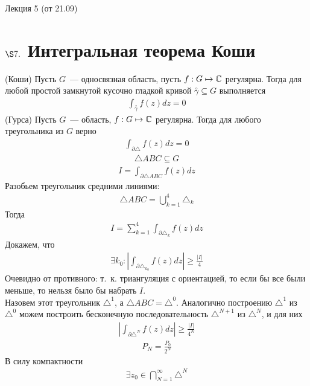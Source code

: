 \LARGE{Лекция 5 (от 21.09)}
\normalsize
\section{$\S 7.$ Интегральная теорема Коши}
\theorem (Коши)
Пусть $G$~--- односвязная область, пусть $f: G \mapsto \mathbb{C}$
регулярна. Тогда для любой простой замкнутой кусочно гладкой кривой
$\overset{\circ}{\gamma} \subseteq G$ \hypertarget{(1)}{выполняется}
\begin{align}
  \int_{\overset{\circ}{\gamma}}f(z)dz = 0
\end{align}
\lemma (Гурса)
Пусть $G$~--- область, $f: G \mapsto \mathbb{C}$ регулярна. Тогда для
любого треугольника из $G$ \hypertarget{(2)}{верно}
\begin{align}
  \int_{\partial \triangle} f(z) dz = 0
\end{align}
\pr
\begin{align*}
  \triangle ABC \subseteq G
\end{align*}
\begin{align*}
  I = \int_{\partial \triangle ABC}f(z)dz
\end{align*}
Разобьем треугольник средними линиями:
\begin{align*}
  \triangle ABC = \bigcup_{k=1}^{4}\triangle_k
\end{align*}
Тогда
\begin{align*}
  I = \sum_{k=1}^4\int_{\partial \triangle_k}f(z)dz
\end{align*}
Докажем, что
\begin{align*}
  \exists k_0: \left| \int_{\partial \triangle_{k_0}} f(z)dz\right|\geq\frac{\left| I \right|}{4}
\end{align*}
Очевидно от противного: т.~к. триангуляция с ориентацией, то если бы все были
меньше, то нельзя было бы набрать $I$.
\\
Назовем этот треугольник $\triangle^1$, а $\triangle ABC = \triangle^0$.
Аналогично построению $\triangle^1$ из $\triangle^0$ можем построить
бесконечную последовательность $\triangle^{N+1}$ из $\triangle^N$, и для них
\begin{align*}
  \left| \int_{\partial \triangle^N} f(z)dz\right|\geq\frac{\left| I \right|}{4^N}
\end{align*}
\begin{align*}
  P_N = \frac{P_0}{2^N}
\end{align*}
В силу компактности
\begin{align*}
  \exists z_0 \in \bigcap_{N=1}^{\infty}\triangle^N
\end{align*}
